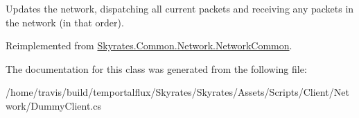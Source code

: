 Updates the network, dispatching all current packets and receiving any packets in the network (in that order). 



Reimplemented from \hyperlink{class_skyrates_1_1_common_1_1_network_1_1_network_common_aeeaf913a5fe9ee8cb966271ee864bc08}{Skyrates.\-Common.\-Network.\-Network\-Common}.



The documentation for this class was generated from the following file\-:\begin{DoxyCompactItemize}
\item 
/home/travis/build/temportalflux/\-Skyrates/\-Skyrates/\-Assets/\-Scripts/\-Client/\-Network/Dummy\-Client.\-cs\end{DoxyCompactItemize}
